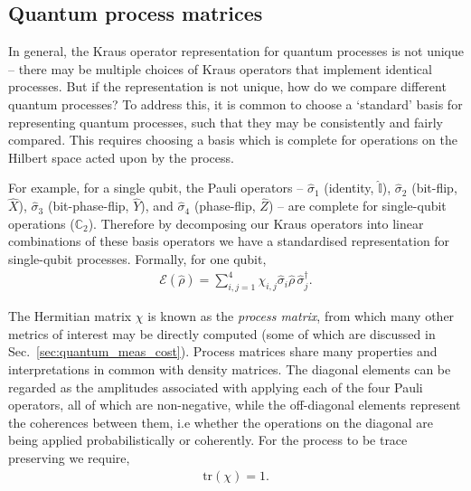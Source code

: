 \documentclass[aps,rmp,twocolumn,amsmath,amssymb,nofootinbib,superscriptaddress,longbibliography,floatfix,table-of-contents,eqsecnum]{revtex4-1}
\begin{document}
%
%

\subsection{Quantum process matrices} 

In general, the Kraus operator representation for quantum processes is not unique -- there may be multiple choices of Kraus operators that implement identical processes. But if the representation is not unique, how do we compare different quantum processes? To address this, it is common to choose a `standard' basis for representing quantum processes, such that they may be consistently and fairly compared. This requires choosing a basis which is complete for operations on the Hilbert space acted upon by the process.

For example, for a single qubit, the Pauli operators -- $\hat\sigma_1$ (identity, $\mathbb{\hat{I}}$), $\hat\sigma_2$ (bit-flip, $\hat{X}$), $\hat\sigma_3$ (bit-phase-flip, $\hat{Y}$), and $\hat\sigma_4$ (phase-flip, $\hat{Z}$) -- are complete for single-qubit operations ($\mathbb{C}_2$). Therefore by decomposing our Kraus operators into linear combinations of these basis operators we have a standardised representation for single-qubit processes. Formally, for one qubit,
\begin{align} \label{eq:process_matrix}
\mathcal{E}(\hat\rho) = \sum_{i,j=1}^4 \chi_{i,j} \hat{\sigma}_i\hat\rho\,\hat{\sigma}_j^\dag.
\end{align}

The Hermitian matrix $\chi$ is known as the \textit{process matrix}, from which many other metrics of interest may be directly computed (some of which are discussed in Sec.~\ref{sec:quantum_meas_cost}). Process matrices share many properties and interpretations in common with density matrices. The diagonal elements can be regarded as the amplitudes associated with applying each of the four Pauli operators, all of which are non-negative, while the off-diagonal elements represent the coherences between them, i.e whether the operations on the diagonal are being applied probabilistically or coherently. For the process to be trace preserving we require,
\begin{align}
\text{tr}(\chi) = 1.
\end{align}
\end{document}
